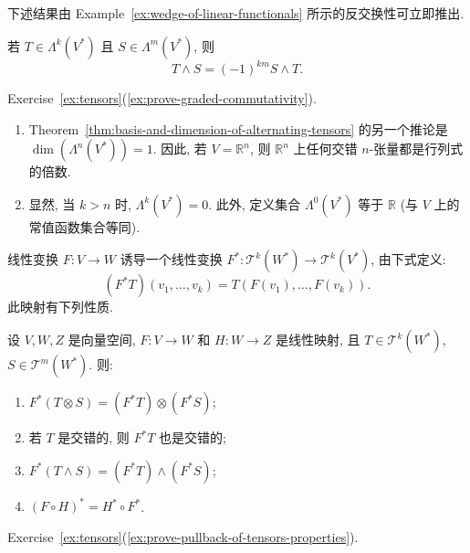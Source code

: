 下述结果由 Example~\ref{ex:wedge-of-linear-functionals} 所示的反交换性可立即推出.

\begin{RiemannProposition}\label{prop:graded-commutativity-of-wedge-product}
若 $T\in\Lambda^k(V^*)$ 且 $S\in\Lambda^m(V^*)$, 则
\[
  T\wedge S=(-1)^{km}S\wedge T.
\]
\end{RiemannProposition}

\begin{RiemannProof}
Exercise~\ref{ex:tensors}(\ref{ex:prove-graded-commutativity}).
\end{RiemannProof}

\begin{RiemannRemark}\label{rem:top-degree-and-zero-degree-alternating-tensors}
\begin{enumerate}[label=(\arabic*),leftmargin=*]
\item Theorem~\ref{thm:basis-and-dimension-of-alternating-tensors} 的另一个推论是 $\dim(\Lambda^n(V^*))=1$. 因此, 若 $V=\mathbb{R}^n$, 则 $\mathbb{R}^n$ 上任何交错 $n$-张量都是行列式的倍数.
\item 显然, 当 $k>n$ 时, $\Lambda^k(V^*)=0$. 此外, 定义集合 $\Lambda^0(V^*)$ 等于 $\mathbb{R}$ (与 $V$ 上的常值函数集合等同).
\end{enumerate}
\end{RiemannRemark}

线性变换 $F:V\to W$ 诱导一个线性变换 $F^*:\mathcal{T}^k(W^*)\to\mathcal{T}^k(V^*)$, 由下式定义:
\[
  (F^*T)(v_1,\ldots,v_k)=T(F(v_1),\ldots,F(v_k)).
\]
此映射有下列性质.

\begin{RiemannProposition}\label{prop:pullback-of-tensors}
设 $V,W,Z$ 是向量空间, $F:V\to W$ 和 $H:W\to Z$ 是线性映射, 且 $T\in\mathcal{T}^k(W^*)$, $S\in\mathcal{T}^m(W^*)$. 则:
\begin{enumerate}[label=(\arabic*),leftmargin=*]
\item $F^*(T\otimes S)=(F^*T)\otimes(F^*S)$;
\item 若 $T$ 是交错的, 则 $F^*T$ 也是交错的;
\item $F^*(T\wedge S)=(F^*T)\wedge(F^*S)$;
\item $(F\circ H)^*=H^*\circ F^*$.
\end{enumerate}
\end{RiemannProposition}

\begin{RiemannProof}
Exercise~\ref{ex:tensors}(\ref{ex:prove-pullback-of-tensors-properties}).
\end{RiemannProof}

